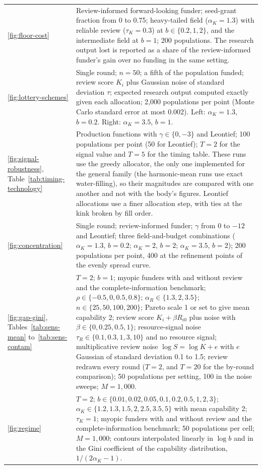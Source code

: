 \begin{table}[h]
\begin{tabular}{@{}p{2.1cm}p{10.2cm}@{}}
\ref{fig:floor-cost} & Review-informed forward-looking funder; seed-grant fraction from 0 to 0.75; heavy-tailed field ($\alpha_K = 1.3$) with reliable review ($\tau_K = 0.3$) at $b \in \{0.2, 1, 2\}$, and the intermediate field at $b = 1$; 200 populations. The research output lost is reported as a share of the review-informed funder's gain over no funding in the same setting. \\
\ref{fig:lottery-schemes} & Single round; $n = 50$; a fifth of the population funded; review score $K_i$ plus Gaussian noise of standard deviation $\tau$; expected research output computed exactly given each allocation; 2{,}000 populations per point (Monte Carlo standard error at most 0.002). Left: $\alpha_K = 1.3$, $b = 0.2$. Right: $\alpha_K = 3.5$, $b = 1$. \\
\ref{fig:signal-robustness}, Table~\ref{tab:timing-technology} & Production functions with $\gamma \in \{0, -3\}$ and Leontief; 100 populations per point (50 for Leontief); $T = 2$ for the signal value and $T = 5$ for the timing table. These runs use the greedy allocator, the only one implemented for the general family (the harmonic-mean runs use exact water-filling), so their magnitudes are compared with one another and not with the body's figures. Leontief allocations use a finer allocation step, with ties at the kink broken by fill order. \\
\ref{fig:concentration} & Single round; review-informed funder; $\gamma$ from 0 to $-12$ and Leontief; three field-and-budget combinations ($\alpha_K = 1.3$, $b = 0.2$; $\alpha_K = 2$, $b = 2$; $\alpha_K = 3.5$, $b = 2$); 200 populations per point, 400 at the refinement points of the evenly spread curve. \\
\ref{fig:gap-gini}, Tables~\ref{tab:sens-mean} to~\ref{tab:sens-contam} & $T = 2$; $b = 1$; myopic funders with and without review and the complete-information benchmark; $\rho \in \{-0.5, 0, 0.5, 0.8\}$; $\alpha_R \in \{1.3, 2, 3.5\}$; $n \in \{25, 50, 100, 200\}$; Pareto scale 1 or set to give mean capability 2; review score $K_i + \beta R_{i0}$ plus noise with $\beta \in \{0, 0.25, 0.5, 1\}$; resource-signal noise $\tau_R \in \{0.1, 0.3, 1, 3, 10\}$ and no resource signal; multiplicative review noise $\log S = \log K + e$ with $e$ Gaussian of standard deviation 0.1 to 1.5; review redrawn every round ($T = 2$, and $T = 20$ for the by-round comparison); 50 populations per setting, 100 in the noise sweeps; $M = 1{,}000$. \\
\ref{fig:regime} & $T = 2$; $b \in \{0.01, 0.02, 0.05, 0.1, 0.2, 0.5, 1, 2, 3\}$; $\alpha_K \in \{1.2, 1.3, 1.5, 2, 2.5, 3.5, 5\}$ with mean capability 2; $\tau_K = 1$; myopic funders with and without review and the complete-information benchmark; 50 populations per cell; $M = 1{,}000$; contours interpolated linearly in $\log b$ and in the Gini coefficient of the capability distribution, $1/(2\alpha_K - 1)$. \\

\end{tabular}
\end{table}
